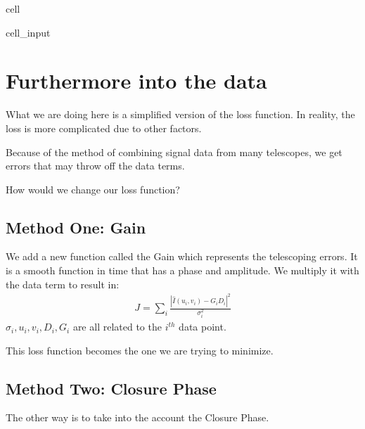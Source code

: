 \documentclass[letterpaper,10pt,english]{jupyterBook}
\begin{document}
\begin{sphinxuseclass}{cell}
\begin{sphinxVerbatimInput}
\begin{sphinxuseclass}{cell_input}
\begin{sphinxVerbatim}[commandchars=\\\{\}]
           
\end{sphinxVerbatim}

\end{sphinxuseclass}\end{sphinxVerbatimInput}

\end{sphinxuseclass}

\section{Furthermore into the data}
\label{\detokenize{loss:furthermore-into-the-data}}
\sphinxAtStartPar
What we are doing here is a simplified version of the loss function. In reality, the loss is more complicated due to other factors.

\sphinxAtStartPar
Because of the method of combining signal data from many telescopes, we get errors that may throw off the data terms.

\sphinxAtStartPar
How would we change our loss function?


\subsection{Method One: Gain}
\label{\detokenize{loss:method-one-gain}}
\sphinxAtStartPar
We add a new function called the Gain which represents the telescoping errors. It is a smooth function in time that has a phase and amplitude. We multiply it with the data term to result in:
\begin{equation*}
\begin{split}J = \sum_{i}\frac{|\hat{I}(u_i,v_i) - G_i D_i|^2}{\sigma_i^2}\end{split}
\end{equation*}
\sphinxAtStartPar
\(\sigma_i, u_i, v_i, D_i, G_i\) are all related to the \(i^{th}\) data point.

\sphinxAtStartPar
This loss function becomes the one we are trying to minimize.


\subsection{Method Two: Closure Phase}
\label{\detokenize{loss:method-two-closure-phase}}
\sphinxAtStartPar
The other way is to take into the account the Closure Phase.
\end{document}
